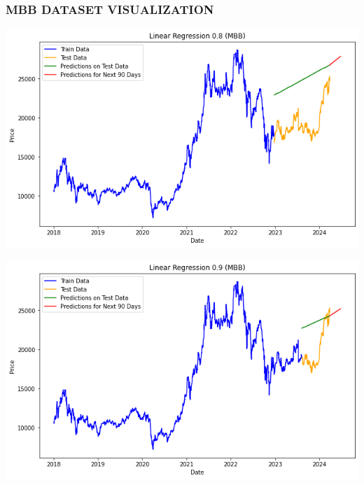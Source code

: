 \documentclass[conference]{IEEEtran}
\begin{document}
\subsubsection{MBB DATASET VISUALIZATION}

\begin{minipage}{0.23\textwidth}
    \centering
    \includegraphics[width=\linewidth]{images/LR/LinearRegression_MBB_90days_82.png}
    \label{fig:image1}
\end{minipage}
\hfill
\begin{minipage}{0.23\textwidth}
    \centering
    \includegraphics[width=\linewidth]{images/LR/LinearRegression_MBB_90days_91.png}
    \label{fig:image2}
\end{minipage}
\end{document}
